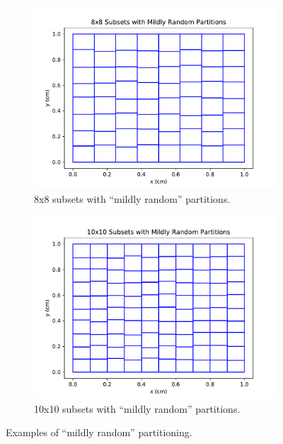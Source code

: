 \documentclass[times,final]{elsarticle}
\begin{document}
\begin{figure}[H]
\begin{subfigure}[b]{0.45\textwidth}
  \includegraphics[width=\textwidth]{../Dissertation/cut_line_files/8_mild_random.pdf}
  \caption{8x8 subsets with ``mildly random'' partitions.}
  \label{8mildrandom}
\end{subfigure}
\begin{subfigure}[b]{0.45\textwidth}
  \includegraphics[width=\textwidth]{../Dissertation/cut_line_files/10_mild_random.pdf}
  \caption{10x10 subsets with ``mildly random'' partitions.}
  \label{10mildrandom}
\end{subfigure}
\caption{Examples of ``mildly random'' partitioning.}
\label{mild_random_partitions}
\end{figure}
\end{document}
